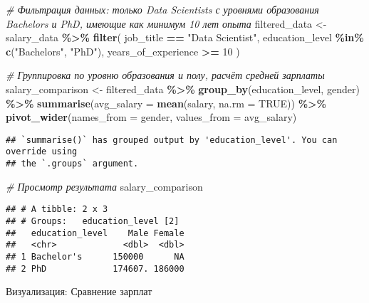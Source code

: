 \documentclass[
]{article}
\newenvironment{Shaded}{\begin{snugshade}}{\end{snugshade}}
\newcommand{\AttributeTok}[1]{\textcolor[rgb]{0.13,0.29,0.53}{#1}}
\newcommand{\CommentTok}[1]{\textcolor[rgb]{0.56,0.35,0.01}{\textit{#1}}}
\newcommand{\ConstantTok}[1]{\textcolor[rgb]{0.56,0.35,0.01}{#1}}
\newcommand{\DecValTok}[1]{\textcolor[rgb]{0.00,0.00,0.81}{#1}}
\newcommand{\FunctionTok}[1]{\textcolor[rgb]{0.13,0.29,0.53}{\textbf{#1}}}
\newcommand{\NormalTok}[1]{#1}
\newcommand{\OtherTok}[1]{\textcolor[rgb]{0.56,0.35,0.01}{#1}}
\newcommand{\SpecialCharTok}[1]{\textcolor[rgb]{0.81,0.36,0.00}{\textbf{#1}}}
\newcommand{\StringTok}[1]{\textcolor[rgb]{0.31,0.60,0.02}{#1}}
\begin{document}
\begin{Shaded}
\begin{Highlighting}[]
\CommentTok{\# Фильтрация данных: только Data Scientists с уровнями образования Bachelor\textquotesingle{}s и PhD, имеющие как минимум 10 лет опыта}
\NormalTok{filtered\_data }\OtherTok{\textless{}{-}}\NormalTok{ salary\_data }\SpecialCharTok{\%\textgreater{}\%}
  \FunctionTok{filter}\NormalTok{(}
\NormalTok{    job\_title }\SpecialCharTok{==} \StringTok{"Data Scientist"}\NormalTok{,}
\NormalTok{    education\_level }\SpecialCharTok{\%in\%} \FunctionTok{c}\NormalTok{(}\StringTok{"Bachelor\textquotesingle{}s"}\NormalTok{, }\StringTok{"PhD"}\NormalTok{),}
\NormalTok{    years\_of\_experience }\SpecialCharTok{\textgreater{}=} \DecValTok{10}
\NormalTok{  )}

\CommentTok{\# Группировка по уровню образования и полу, расчёт средней зарплаты}
\NormalTok{salary\_comparison }\OtherTok{\textless{}{-}}\NormalTok{ filtered\_data }\SpecialCharTok{\%\textgreater{}\%}
  \FunctionTok{group\_by}\NormalTok{(education\_level, gender) }\SpecialCharTok{\%\textgreater{}\%}
  \FunctionTok{summarise}\NormalTok{(}\AttributeTok{avg\_salary =} \FunctionTok{mean}\NormalTok{(salary, }\AttributeTok{na.rm =} \ConstantTok{TRUE}\NormalTok{)) }\SpecialCharTok{\%\textgreater{}\%}
  \FunctionTok{pivot\_wider}\NormalTok{(}\AttributeTok{names\_from =}\NormalTok{ gender, }\AttributeTok{values\_from =}\NormalTok{ avg\_salary)}
\end{Highlighting}
\end{Shaded}

\begin{verbatim}
## `summarise()` has grouped output by 'education_level'. You can override using
## the `.groups` argument.
\end{verbatim}

\begin{Shaded}
\begin{Highlighting}[]
\CommentTok{\# Просмотр результата}
\NormalTok{salary\_comparison}
\end{Highlighting}
\end{Shaded}

\begin{verbatim}
## # A tibble: 2 x 3
## # Groups:   education_level [2]
##   education_level    Male Female
##   <chr>             <dbl>  <dbl>
## 1 Bachelor's      150000      NA
## 2 PhD             174607. 186000
\end{verbatim}

Визуализация: Сравнение зарплат
\end{document}
